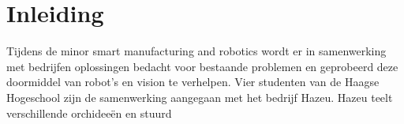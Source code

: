 \section{Inleiding}

Tijdens de minor smart manufacturing and robotics wordt er in samenwerking met bedrijfen oplossingen bedacht voor bestaande problemen en geprobeerd deze doormiddel van robot's en vision te verhelpen. Vier studenten van de Haagse Hogeschool zijn de samenwerking aangegaan met het bedrijf Hazeu. Hazeu teelt verschillende orchideeën en stuurd

  